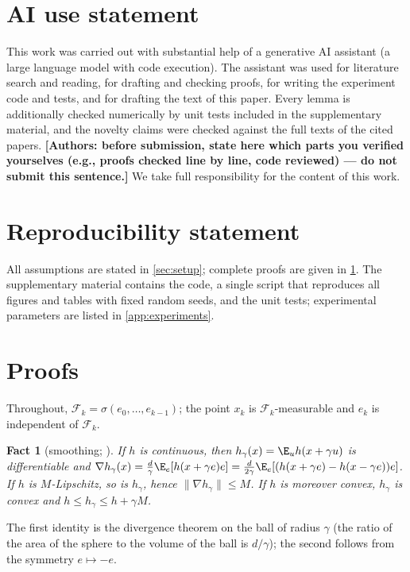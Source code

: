\documentclass{article} %
\newcommand{\cF}{\mathcal{F}}
\newcommand{\norm}[1]{\lVert #1\rVert}
\theoremstyle{plain}
\newtheorem{fact}{Fact}
\theoremstyle{definition}
\theoremstyle{remark}
\begin{document}
\section*{AI use statement}
This work was carried out with substantial help of a generative AI assistant (a large language model with code execution). The assistant was used for literature search and reading, for drafting and checking proofs, for writing the experiment code and tests, and for drafting the text of this paper. Every lemma is additionally checked numerically by unit tests included in the supplementary material, and the novelty claims were checked against the full texts of the cited papers. \textbf{[Authors: before submission, state here which parts you verified yourselves (e.g., proofs checked line by line, code reviewed) --- do not submit this sentence.]} We take full responsibility for the content of this work.

\section*{Reproducibility statement}
All assumptions are stated in \cref{sec:setup}; complete proofs are given in \cref{app:proofs}. The supplementary material contains the code, a single script that reproduces all figures and tables with fixed random seeds, and the unit tests; experimental parameters are listed in \cref{app:experiments}.




\appendix

\section{Proofs}\label{app:proofs}

Throughout, $\cF_k=\sigma(e_0,\dots,e_{k-1})$; the point $x_k$ is $\cF_k$-measurable and $e_k$ is independent of $\cF_k$.

\begin{fact}[smoothing; \citealp{flaxman2005online,gasnikov2022survey}]\label{fact:smooth}
If $h$ is continuous, then $h_\gamma(x)=\E_uh(x+\gamma u)$ is differentiable and
$\nabla h_\gamma(x)=\frac d\gamma\E_e[h(x+\gamma e)e]=\frac d{2\gamma}\E_e[(h(x+\gamma e)-h(x-\gamma e))e]$.
If $h$ is $M$-Lipschitz, so is $h_\gamma$, hence $\norm{\nabla h_\gamma}\le M$. If $h$ is moreover convex, $h_\gamma$ is convex and $h\le h_\gamma\le h+\gamma M$.
\end{fact}
The first identity is the divergence theorem on the ball of radius $\gamma$ (the ratio of the area of the sphere to the volume of the ball is $d/\gamma$); the second follows from the symmetry $e\mapsto-e$.
\end{document}
